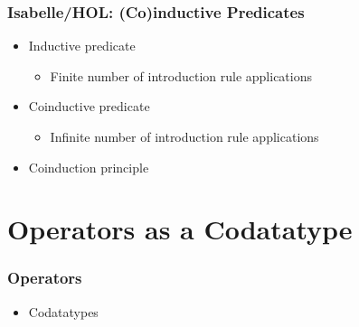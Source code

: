 \documentclass[aspectratio=169,10pt]{beamer}
\begin{document}
\begin{frame}[fragile]
  \frametitle{Isabelle/HOL: (Co)inductive Predicates}
  \begin{itemize}
    \item Inductive predicate
          \begin{itemize}
            \item Finite number of introduction rule applications
          \end{itemize}

          \pause
    \item Coinductive predicate
          \begin{itemize}
            \item Infinite number of introduction rule applications
          \end{itemize}

          \pause
    \item Coinduction principle
  \end{itemize}
\end{frame}

\section{Operators as a Codatatype}

\begin{frame}[fragile]
  \frametitle{Operators}
  \begin{itemize}
    \item Codatatypes
          \vspace*{-1ex}
  \end{itemize}
\end{frame}
\end{document}
